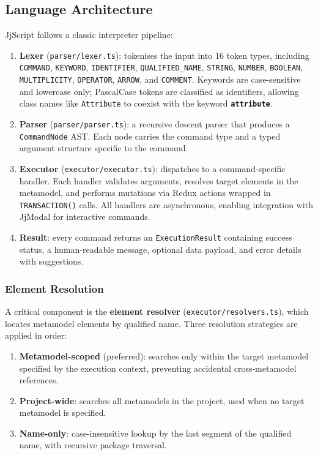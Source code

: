 \documentclass[11pt,a4paper]{article}
\newcommand{\jjmodal}{\textsf{JjModal}}
\newcommand{\jjscript}{\textsf{JjScript}}
\newcommand{\kw}[1]{\texttt{\textbf{#1}}}
\begin{document}
\subsection{Language Architecture}\label{sec:jjscript-arch}

\jjscript{} follows a classic interpreter pipeline:

\begin{enumerate}
    \item \textbf{Lexer} (\texttt{parser/lexer.ts}): tokenises the input
          into 16 token types, including \texttt{COMMAND}, \texttt{KEYWORD},
          \texttt{IDENTIFIER}, \texttt{QUALIFIED\_NAME}, \texttt{STRING},
          \texttt{NUMBER}, \texttt{BOOLEAN}, \texttt{MULTIPLICITY},
          \texttt{OPERATOR}, \texttt{ARROW}, and \texttt{COMMENT}. Keywords
          are case-sensitive and lowercase only; PascalCase tokens are
          classified as identifiers, allowing class names like
          \texttt{Attribute} to coexist with the keyword \kw{attribute}.
    \item \textbf{Parser} (\texttt{parser/parser.ts}): a recursive descent
          parser that produces a \texttt{CommandNode} AST. Each node
          carries the command type and a typed argument structure specific
          to the command.
    \item \textbf{Executor} (\texttt{executor/executor.ts}): dispatches to
          a command-specific handler. Each handler validates arguments,
          resolves target elements in the metamodel, and performs mutations
          via Redux actions wrapped in \texttt{TRANSACTION()} calls. All
          handlers are asynchronous, enabling integration with \jjmodal{}
          for interactive commands.
    \item \textbf{Result}: every command returns an \texttt{ExecutionResult}
          containing success status, a human-readable message, optional
          data payload, and error details with suggestions.
\end{enumerate}

\subsubsection{Element Resolution}

A critical component is the \textbf{element resolver}
(\texttt{executor/resolvers.ts}), which locates metamodel elements by
qualified name. Three resolution strategies are applied in order:

\begin{enumerate}
    \item \textbf{Metamodel-scoped} (preferred): searches only within the
          target metamodel specified by the execution context, preventing
          accidental cross-metamodel references.
    \item \textbf{Project-wide}: searches all metamodels in the project,
          used when no target metamodel is specified.
    \item \textbf{Name-only}: case-insensitive lookup by the last segment
          of the qualified name, with recursive package traversal.
\end{enumerate}
\end{document}

